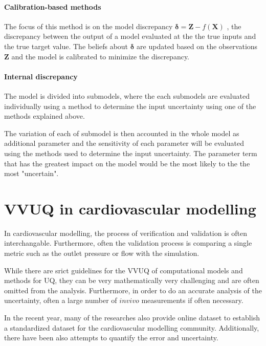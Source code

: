 \paragraph{Calibration-based methods } 
The focus of this method is on the model discrepancy $\mathbf{\delta} = \textbf{Z} - f(\textbf{X})$ , the discrepancy between the output of a model evaluated at the the true inputs and the true target value. The beliefs about $\mathbf{\delta}$ are updated based on the observations \textbf{Z} and the model is calibrated to minimize the discrepancy. \par

\paragraph{Internal discrepancy}
The model is divided into submodels, where the each submodels are evaluated individually using a method to determine the input uncertainty using one of the methods explained above. \par

The variation of each of submodel is then accounted in the whole model as additional parameter and the sensitivity of each parameter will be evaluated using the methods used to determine the input uncertainty. The parameter term that has the greatest impact on the model would be the most likely to the the most "uncertain". \par


\section{VVUQ in cardiovascular modelling}
In cardiovascular modelling, the process of verification and validation is often interchangable. Furthermore, often the validation process is comparing a single metric such as the outlet pressure or flow with the simulation. \par

While there are srict guidelines for the VVUQ of computational models and methods for UQ, they can be very mathematically very challenging and are often omitted from the analysis. Furthermore, in order to do an accurate analysis of the uncertainty, often a large number of $in vivo$ measurements if often necessary. \par

In the recent year, many of the researches also provide online dataset to establish a standardized dataset for the cardiovascular modelling community. Additionally, there have been also attempts to quantify the error and uncertainty. \par

